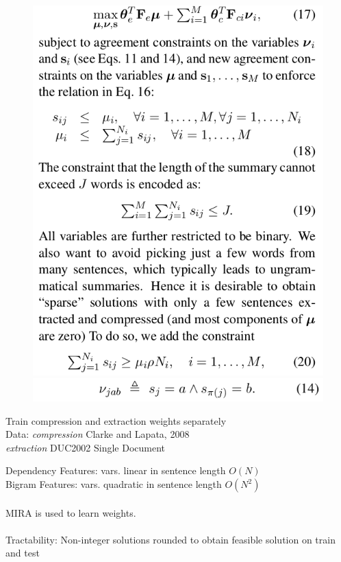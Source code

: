 \documentclass[xcolor={table}]{beamer}
\begin{document}
\begin{frame}[t]{\cite{martins2009summarization}}
      \begin{figure}[h]
          \centering
      \includegraphics[scale=.25]{images/obj-martins09.png} \\
      \includegraphics[scale=.25]{images/cons-martins09.png} \\
  \end{figure}
\end{frame}

\begin{frame}[t]{\cite{martins2009summarization}}
    Train compression and extraction weights separately \\
    Data: \textit{compression} Clarke and Lapata, 2008\\
    \textit{extraction} DUC2002 Single Document

    Dependency Features: vars. linear in sentence length $O(N)$ \\
    Bigram Features: vars. quadratic in sentence length $O(N^2)$ \\
~\\
    MIRA is used to learn weights.\\
~\\
    \textcolor{red!70}{Tractability: Non-integer solutions rounded to obtain 
    feasible solution on train and test}\\
        

\end{frame}
\end{document}
